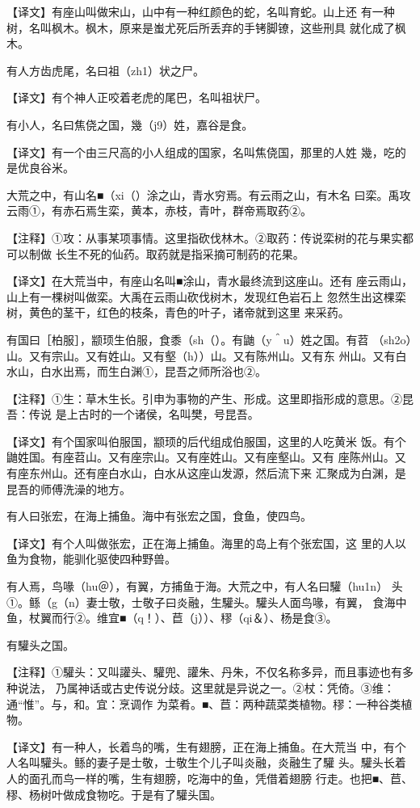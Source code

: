 \documentclass[a4paper,12pt,UTF8,twoside]{ctexbook}
\begin{document}
【译文】有座山叫做宋山，山中有一种红颜色的蛇，名叫育蛇。山上还 有一种树，名叫枫木。枫木，原来是蚩尤死后所丢弃的手铐脚镣，这些刑具 就化成了枫木。

有人方齿虎尾，名曰祖（zh1）状之尸。

【译文】有个神人正咬着老虎的尾巴，名叫祖状尸。

有小人，名曰焦侥之国，幾（j9）姓，嘉谷是食。

【译文】有一个由三尺高的小人组成的国家，名叫焦侥国，那里的人姓 幾，吃的是优良谷米。

大荒之中，有山名■（xi（）涂之山，青水穷焉。有云雨之山，有木名 曰栾。禹攻云雨①，有赤石焉生栾，黄本，赤枝，青叶，群帝焉取药②。

【注释】①攻：从事某项事情。这里指砍伐林木。②取药：传说栾树的花与果实都可以制做 长生不死的仙药。取药就是指采摘可制药的花果。

【译文】在大荒当中，有座山名叫■涂山，青水最终流到这座山。还有 座云雨山，山上有一棵树叫做栾。大禹在云雨山砍伐树木，发现红色岩石上 忽然生出这棵栾树，黄色的茎干，红色的枝条，青色的叶子，诸帝就到这里 来采药。

有国曰［柏服］，颛顼生伯服，食黍（sh（）。有鼬（y＾u）姓之国。有苕 （sh2o）山。又有宗山。又有姓山。又有壑（h））山。又有陈州山。又有东 州山。又有白水山，白水出焉，而生白渊①，昆吾之师所浴也②。

【注释】①生：草木生长。引申为事物的产生、形成。这里即指形成的意思。②昆吾：传说 是上古时的一个诸侯，名叫樊，号昆吾。

【译文】有个国家叫伯服国，颛顼的后代组成伯服国，这里的人吃黄米 饭。有个鼬姓国。有座苕山。又有座宗山。又有座姓山。又有座壑山。又有 座陈州山。又有座东州山。还有座白水山，白水从这座山发源，然后流下来 汇聚成为白渊，是昆吾的师傅洗澡的地方。

有人曰张宏，在海上捕鱼。海中有张宏之国，食鱼，使四鸟。

【译文】有个人叫做张宏，正在海上捕鱼。海里的岛上有个张宏国，这 里的人以鱼为食物，能驯化驱使四种野兽。

有人焉，鸟喙（hu＠），有翼，方捕鱼于海。大荒之中，有人名曰驩（hu1n） 头①。鲧（g（n）妻士敬，士敬子曰炎融，生驩头。驩头人面鸟喙，有翼， 食海中鱼，杖翼而行②。维宜■（q！）、苣（j））、穋（qi＆）、杨是食③。

有驩头之国。

【注释】①驩头：又叫讙头、驩兜、讙朱、丹朱，不仅名称多异，而且事迹也有多种说法， 乃属神话或古史传说分歧。这里就是异说之一。②杖：凭倚。③维：通“惟”。与，和。宜：烹调作 为菜肴。■、苣：两种蔬菜类植物。穋：一种谷类植物。

【译文】有一种人，长着鸟的嘴，生有翅膀，正在海上捕鱼。在大荒当 中，有个人名叫驩头。鲧的妻子是士敬，士敬生个儿子叫炎融，炎融生了驩 头。驩头长着人的面孔而鸟一样的嘴，生有翅膀，吃海中的鱼，凭借着翅膀 行走。也把■、苣、穋、杨树叶做成食物吃。于是有了驩头国。
\end{document}
